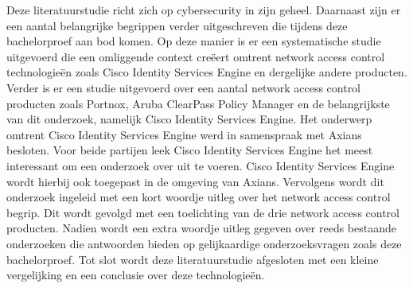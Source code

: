 Deze literatuurstudie richt zich op cybersecurity in zijn geheel. Daarnaast zijn er een aantal belangrijke begrippen verder uitgeschreven die tijdens deze bachelorproef aan bod komen. Op deze manier is er een systematische studie uitgevoerd die een omliggende context creëert omtrent network access control technologieën zoals Cisco Identity Services Engine en dergelijke andere producten. 
\newline
\newline
Verder is er een studie uitgevoerd over een aantal network access control producten zoals Portnox, Aruba ClearPass Policy Manager en de belangrijkste van dit onderzoek, namelijk Cisco Identity Services Engine. Het onderwerp omtrent Cisco Identity Services Engine werd in samenspraak met Axians besloten. Voor beide partijen leek Cisco Identity Services Engine het meest interessant om een onderzoek over uit te voeren. Cisco Identity Services Engine wordt hierbij ook toegepast in de omgeving van Axians. Vervolgens wordt dit onderzoek ingeleid met een kort woordje uitleg over het network access control begrip. 
\newline
\newline
Dit wordt gevolgd met een toelichting van de drie network access control producten. Nadien wordt een extra woordje uitleg gegeven over reeds bestaande onderzoeken die antwoorden bieden op gelijkaardige onderzoeksvragen zoals deze bachelorproef.
\newline
\newline
Tot slot wordt deze literatuurstudie afgesloten met een kleine vergelijking en een conclusie over deze technologieën. 

\newpage

